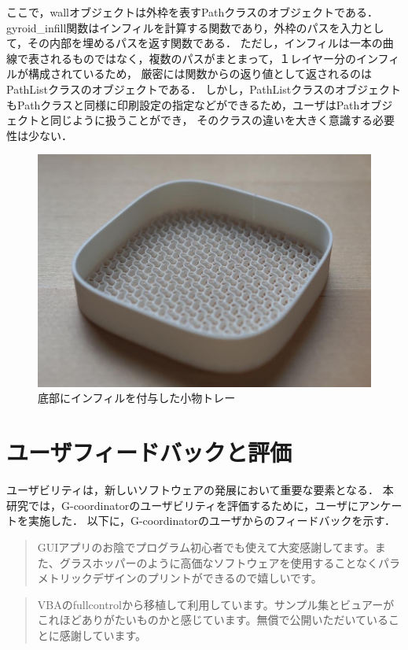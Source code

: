 \documentclass{article}
\begin{document}
\begin{twocolumn}
\begin{itemize}
ここで，wallオブジェクトは外枠を表すPathクラスのオブジェクトである．
gyroid\_infill関数はインフィルを計算する関数であり，外枠のパスを入力として，その内部を埋めるパスを返す関数である．
ただし，インフィルは一本の曲線で表されるものではなく，複数のパスがまとまって，１レイヤー分のインフィルが構成されているため，
厳密には関数からの返り値として返されるのはPathListクラスのオブジェクトである．
しかし，PathListクラスのオブジェクトもPathクラスと同様に印刷設定の指定などができるため，ユーザはPathオブジェクトと同じように扱うことができ，
そのクラスの違いを大きく意識する必要性は少ない．
\begin{figure}[htbp]
  \includegraphics[width=\linewidth]{img/infill_case.JPG}
  \caption{底部にインフィルを付与した小物トレー}
  \label{fig:infill}
\end{figure}

\section{ユーザフィードバックと評価}
ユーザビリティは，新しいソフトウェアの発展において重要な要素となる．
本研究では，G-coordinatorのユーザビリティを評価するために，ユーザにアンケートを実施した．
以下に，G-coordinatorのユーザからのフィードバックを示す．
\begin{quote}
  GUIアプリのお陰でプログラム初心者でも使えて大変感謝してます。また、グラスホッパーのように高価なソフトウェアを使用することなくパラメトリックデザインのプリントができるので嬉しいです。
\end{quote}

\begin{quote}
  VBAのfullcontrolから移植して利用しています。サンプル集とビュアーがこれほどありがたいものかと感じています。無償で公開いただいていることに感謝しています。
\end{quote}


\end{itemize}
\end{twocolumn}
\end{document}
